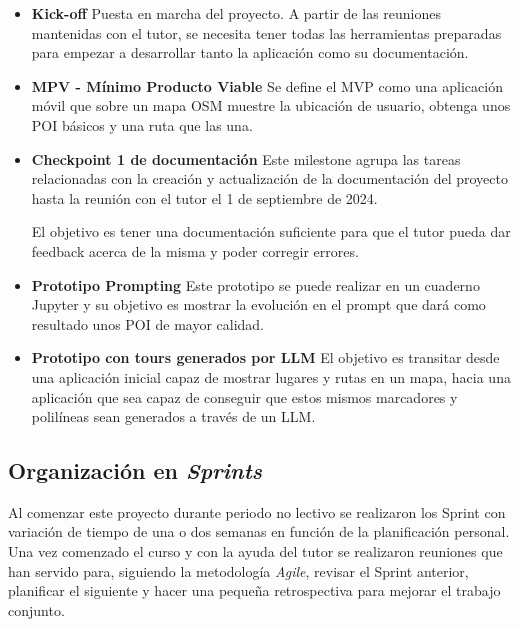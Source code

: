 \begin{itemize}

    \item \textbf{Kick-off} Puesta en marcha del proyecto. A partir de las reuniones mantenidas con el tutor, se necesita tener todas las herramientas preparadas para empezar a desarrollar tanto la aplicación como su documentación.
    
    \item \textbf{MPV - Mínimo Producto Viable} Se define el MVP como una aplicación móvil que sobre un mapa OSM muestre la ubicación de usuario, obtenga unos POI básicos y una ruta que las una.

    \item \textbf{Checkpoint 1 de documentación} Este milestone agrupa las tareas relacionadas con la creación y actualización de la documentación del proyecto hasta la reunión con el tutor el 1 de septiembre de 2024.

    El objetivo es tener una documentación suficiente para que el tutor pueda dar feedback acerca de la misma y poder corregir errores.

    \item \textbf{Prototipo Prompting} Este prototipo se puede realizar en un cuaderno Jupyter y su objetivo es mostrar la evolución en el prompt que dará como resultado unos POI de mayor calidad.
    
    \item \textbf{Prototipo con tours generados por LLM} El objetivo es transitar desde una aplicación inicial capaz de mostrar lugares y rutas en un mapa, hacia una aplicación que sea capaz de conseguir que estos mismos marcadores y polilíneas sean generados a través de un LLM. \label{hito:prototipo_llm}
\end{itemize}

\subsection{Organización en \textit{Sprints}}

Al comenzar este proyecto durante periodo no lectivo se realizaron los Sprint con variación de tiempo de una o dos semanas en función de la planificación personal. Una vez comenzado el curso y con la ayuda del tutor se realizaron reuniones que han servido para, siguiendo la metodología \textit{Agile}, revisar el Sprint anterior, planificar el siguiente y hacer una pequeña retrospectiva para mejorar el trabajo conjunto.


